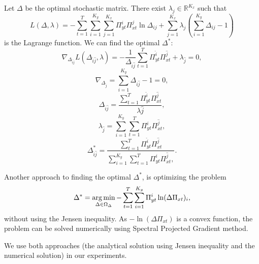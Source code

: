 Let $\Delta$ be the optimal stochastic matrix. There exist $\lambda_j \in \mathbb{R}^{K_x}$ such that
\begin{equation}
    L(\Delta, \lambda) = - \sum_{t=1}^T \sum_{i=1}^{K_y} \sum_{j=1}^{K_x} \Pi_{yt}^i \Pi_{xt}^j \ln \Delta_{ij} + \sum_{j=1}^{K_x} \lambda_j (\sum_{i=1}^{K_y} \Delta_{ij} - 1)
\end{equation}
is the Lagrange function. We can find the optimal $\Delta^*$:
\begin{equation}
    \nabla_{\Delta_{\hat{i}\hat{j}}} L(\Delta_{\hat{i}\hat{j}}, \lambda) = - \frac{1}{\Delta_{\hat{i}\hat{j}}} \sum_{t=1}^{T} \Pi_{yt}^{\hat{i}} \Pi_{xt}^{\hat{j}} + \lambda_{\hat{j}} = 0,
\end{equation}
\begin{equation}
    \nabla_{\Delta_{\hat{j}}} = \sum_{i=1}^{K_y} \Delta_{i\hat{j}} - 1 = 0,
\end{equation}
\begin{equation}
    \Delta_{\hat{i}\hat{j}} = \frac{\sum_{t=1}^{T} \Pi_{yt}^{\hat{i}} \Pi_{xt}^{\hat{j}}}{\lambda{\hat{j}}},
\end{equation}
\begin{equation}
    \lambda_{\hat{j}} = \sum_{i=1}^{K_y} \sum_{t=1}^{T} \Pi_{yt}^{i} \Pi_{xt}^{\hat{j}},
\end{equation}
\begin{equation}
    \Delta_{\hat{i}\hat{j}}^{*} = \frac{\sum_{t=1}^{T} \Pi_{yt}^{\hat{i}} \Pi_{xt}^{\hat{j}}}{\sum_{i=1}^{K_y} \sum_{t=1}^{T} \Pi_{yt}^{i} \Pi_{xt}^{\hat{j}},}.
\end{equation}

Another approach to finding the optimal $\Delta^{*}$, is optimizing the problem
\begin{equation}
    \Delta^* = \operatorname*{arg\,min}_{\Delta \in \Omega_{\Delta}} - \sum_{t=1}^T \sum_{i=1}^{K_y} \Pi_{yt}^i \ln (\Delta\Pi_{xt})_i,
\end{equation}
without using the Jensen inequality.
As $-\ln(\Delta\Pi_{xt})$ is a convex function, the problem can be solved numerically using Spectral Projected Gradient method\cite{birgin2000}.

We use both approaches (the analytical solution using Jensen inequality and the numerical solution) in our experiments.
